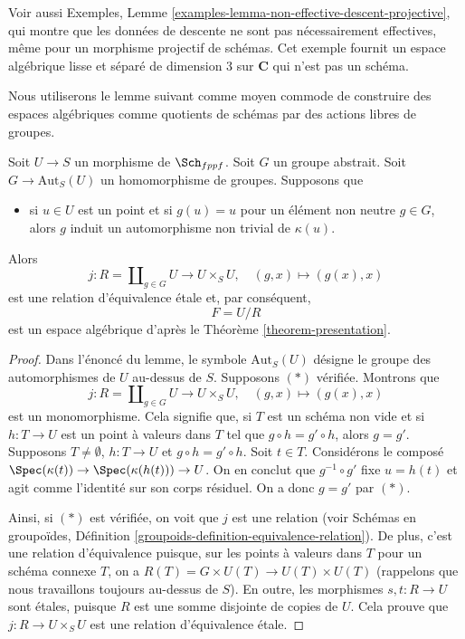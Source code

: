 \noindent
Voir aussi Exemples,
Lemme \ref{examples-lemma-non-effective-descent-projective},
qui montre que les données de descente ne sont pas nécessairement effectives,
même pour un morphisme projectif de schémas. Cet exemple
fournit un espace algébrique lisse et séparé de dimension 3
sur ${\mathbf C}$ qui n'est pas un schéma.

\medskip\noindent
Nous utiliserons le lemme suivant comme moyen commode de construire
des espaces algébriques comme quotients de schémas par des actions libres de groupes.

\begin{lemma}
\label{lemma-quotient}
Soit $U \to S$ un morphisme de $\Sch_{fppf}$.
Soit $G$ un groupe abstrait. Soit $G \to \text{Aut}_S(U)$
un homomorphisme de groupes. Supposons que
\begin{itemize}
\item[(*)] si $u \in U$ est un point et si $g(u) = u$
pour un élément non neutre $g \in G$, alors $g$
induit un automorphisme non trivial de $\kappa(u)$.
\end{itemize}
Alors
$$
j :
R = \coprod\nolimits_{g \in G} U
\longrightarrow
U \times_S U,
\quad
(g, x) \longmapsto (g(x), x)
$$
est une relation d'équivalence \'etale et, par conséquent,
$$
F = U/R
$$
est un espace algébrique d'après le Théorème \ref{theorem-presentation}.
\end{lemma}

\begin{proof}
Dans l'énoncé du lemme, le symbole $\text{Aut}_S(U)$ désigne
le groupe des automorphismes de $U$ au-dessus de $S$.
Supposons $(*)$ vérifiée. Montrons que
$$
j :
R = \coprod\nolimits_{g \in G} U
\longrightarrow
U \times_S U,
\quad
(g, x) \longmapsto (g(x), x)
$$
est un monomorphisme. Cela signifie que, si $T$ est un schéma
non vide et si $h : T \to U$ est un point à valeurs dans $T$ tel que
$g \circ h = g' \circ h$, alors $g = g'$. Supposons
$T \not = \emptyset$, $h : T \to U$ et $g \circ h = g' \circ h$.
Soit $t \in T$. Considérons le composé
$\Spec(\kappa(t)) \to \Spec(\kappa(h(t))) \to U$.
On en conclut que $g^{-1} \circ g'$ fixe $u = h(t)$ et
agit comme l'identité sur son corps résiduel. On a donc $g = g'$ par $(*)$.

\medskip\noindent
Ainsi, si $(*)$ est vérifiée, on voit que $j$ est une relation (voir
Schémas en groupoïdes, Définition \ref{groupoids-definition-equivalence-relation}).
De plus, c'est une relation d'équivalence puisque, sur les points à valeurs dans $T$
pour un schéma connexe $T$, on a
$R(T) = G \times U(T) \to U(T) \times U(T)$ (rappelons que nous
travaillons toujours au-dessus de $S$). En outre, les morphismes $s, t : R \to U$ sont \'etales,
puisque $R$ est une somme disjointe de copies de $U$.
Cela prouve que $j : R \to U \times_S U$ est une relation d'équivalence \'etale.
\end{proof}

